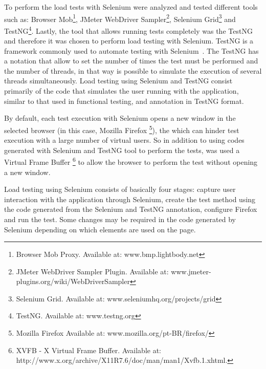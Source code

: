 \documentclass[runningheads,a4paper]{llncs}
\begin{document}
To perform the load tests with Selenium were analyzed and tested different tools such as: Browser Mob\footnote{Browser Mob Proxy. Available at: www.bmp.lightbody.net}, JMeter WebDriver Sampler\footnote{JMeter WebDriver Sampler Plugin. Available at: www.jmeter-plugins.org/wiki/WebDriverSampler}, Selenium Grid\footnote{Selenium Grid. Available at: www.seleniumhq.org/projects/grid} and TestNG\footnote{TestNG. Available at: www.testng.org}. Lastly, the tool that allows running tests completely was the TestNG and therefore it was chosen to perform load testing with Selenium. TestNG is a framework commonly used to automate testing with Selenium~\cite{bindal2014test}. The TestNG has a notation that allow to set the number of times the test must be performed and the number of threads, in that way is possible to simulate the execution of several threads simultaneously. Load testing using Selenium and TestNG consist primarily of the code that simulates the user running with the application, similar to that used in functional testing, and annotation in TestNG format.


By default, each test execution with Selenium opens a new window in the selected browser (in this case, Mozilla Firefox \footnote{Mozilla Firefox Available at: www.mozilla.org/pt-BR/firefox/}), the which can hinder test execution with a large number of virtual users. So in addition to using codes generated with Selenium and TestNG tool to perform the tests, was used a Virtual Frame Buffer \footnote{XVFB - X Virtual Frame Buffer. Available at: http://www.x.org/archive/X11R7.6/doc/man/man1/Xvfb.1.xhtml.} to allow the browser to perform the test without opening a new window.


Load testing using Selenium consists of basically four stages: capture user interaction with the application through Selenium, create the test method using the code generated from the Selenium and TestNG annotation, configure Firefox and run the test. Some changes may be required in the code generated by Selenium depending on which elements are used on the page.
\end{document}
